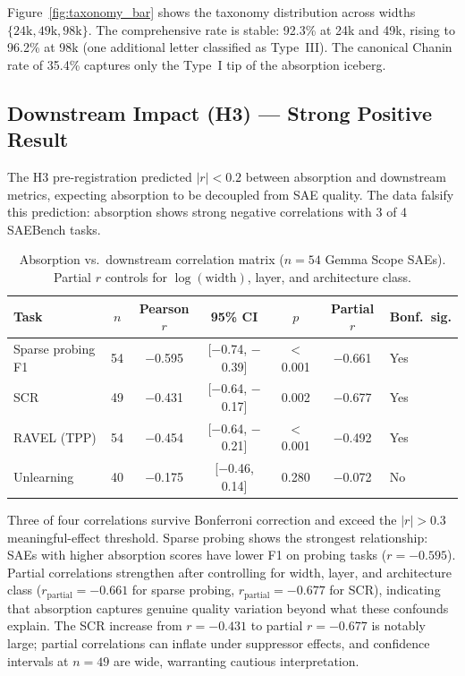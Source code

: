 \documentclass{article}
\begin{document}
Figure~\ref{fig:taxonomy_bar} shows the taxonomy distribution across widths $\{24\text{k}, 49\text{k}, 98\text{k}\}$. The comprehensive rate is stable: 92.3\% at 24k and 49k, rising to 96.2\% at 98k (one additional letter classified as Type~III). The canonical Chanin rate of 35.4\% captures only the Type~I tip of the absorption iceberg.


\subsection{Downstream Impact (H3) --- Strong Positive Result}
\label{sec:results_h3}

The H3 pre-registration predicted $|r| < 0.2$ between absorption and downstream metrics, expecting absorption to be decoupled from SAE quality. The data falsify this prediction: absorption shows strong negative correlations with 3 of 4 SAEBench tasks.

\begin{table}[t]
  \caption{Absorption vs.\ downstream correlation matrix ($n = 54$ Gemma Scope SAEs). Partial $r$ controls for $\log(\text{width})$, layer, and architecture class.}
  \label{tab:downstream_corr}
  \centering
  \small
  \begin{tabular}{@{}lcccccl@{}}
    \toprule
    Task & $n$ & Pearson $r$ & 95\% CI & $p$ & Partial $r$ & Bonf.\ sig. \\
    \midrule
    Sparse probing F1 & 54 & $-$0.595 & [$-$0.74, $-$0.39] & $<$0.001 & $-$0.661 & Yes \\
    SCR & 49 & $-$0.431 & [$-$0.64, $-$0.17] & 0.002 & $-$0.677 & Yes \\
    RAVEL (TPP) & 54 & $-$0.454 & [$-$0.64, $-$0.21] & $<$0.001 & $-$0.492 & Yes \\
    Unlearning & 40 & $-$0.175 & [$-$0.46, 0.14] & 0.280 & $-$0.072 & No \\
    \bottomrule
  \end{tabular}
\end{table}

Three of four correlations survive Bonferroni correction and exceed the $|r| > 0.3$ meaningful-effect threshold. Sparse probing shows the strongest relationship: SAEs with higher absorption scores have lower F1 on probing tasks ($r = -0.595$). Partial correlations strengthen after controlling for width, layer, and architecture class ($r_{\text{partial}} = -0.661$ for sparse probing, $r_{\text{partial}} = -0.677$ for SCR), indicating that absorption captures genuine quality variation beyond what these confounds explain. The SCR increase from $r = -0.431$ to partial $r = -0.677$ is notably large; partial correlations can inflate under suppressor effects, and confidence intervals at $n = 49$ are wide, warranting cautious interpretation.
\end{document}
